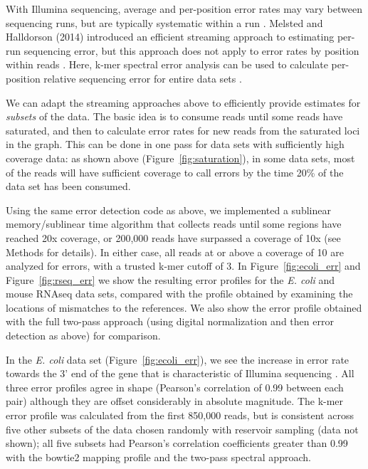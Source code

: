 \documentclass{article}
\begin{document}
With Illumina sequencing, average and per-position error rates may
vary between sequencing runs, but are typically systematic within a
run \cite{drisee}.  Melsted and Halldorson (2014) introduced an
efficient streaming approach to estimating per-run sequencing error,
but this approach does not apply to error rates by position within
reads \cite{Melsted2014}.  Here, k-mer spectral error analysis can be
used to calculate per-position relative sequencing error for entire
data sets \cite{Zhang2014}.

We can adapt the streaming approaches above to efficiently provide
estimates for {\em subsets} of the data.  The basic idea is to consume
reads until some reads have saturated, and then to calculate error
rates for new reads from the saturated loci in the graph.  This
can be done in one pass for data sets with sufficiently high coverage
data: as shown above (Figure~\ref{fig:saturation}), in some data sets,
most of the reads will have sufficient coverage to call errors by the
time 20\% of the data set has been consumed.

Using the same error detection code as above, we implemented a
sublinear memory/sublinear time algorithm that collects reads until
some regions have reached 20x coverage, or 200,000 reads have
surpassed a coverage of 10x (see Methods for details).  In either
case, all reads at or above a coverage of 10 are analyzed for errors,
with a trusted k-mer cutoff of 3.  In Figure~\ref{fig:ecoli_err} and
Figure~\ref{fig:rseq_err} we show the resulting error profiles for the
{\em E. coli} and mouse RNAseq data sets, compared with the profile
obtained by examining the locations of mismatches to the references.
We also show the error profile obtained with the full two-pass approach
(using digital normalization and then error detection as above)
for comparison.

In the {\em E. coli} data set (Figure~\ref{fig:ecoli_err}), we see the
increase in error rate towards the 3' end of the gene that is
characteristic of Illumina sequencing \cite{biases}.  All three error
profiles agree in shape (Pearson's correlation of 0.99 between each
pair) although they are offset considerably in absolute magnitude.
The k-mer error profile was calculated from the first 850,000 reads, but
is consistent across five other subsets of the data chosen randomly
with reservoir sampling (data not shown); all five subsets had
Pearson's correlation coefficients greater than 0.99 with the
bowtie2 mapping profile and the two-pass spectral approach.
\end{document}

